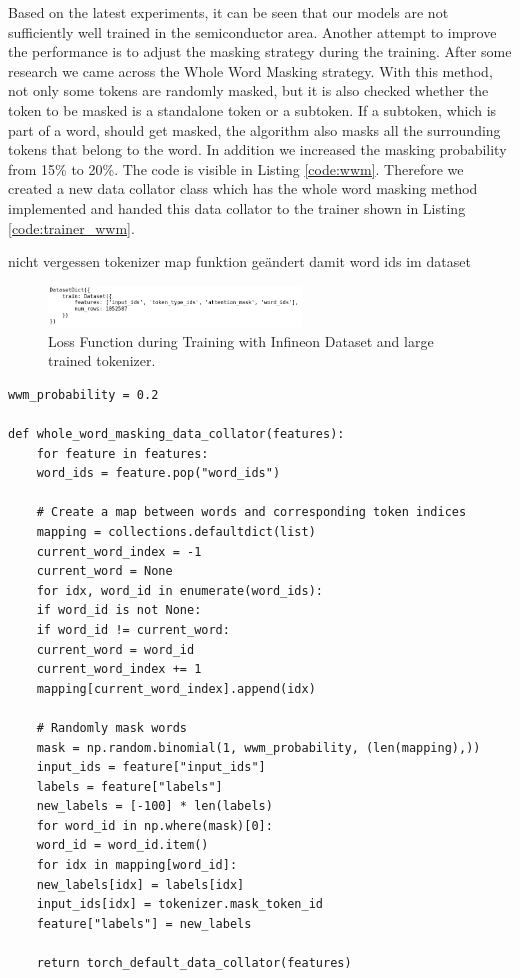 Based on the latest experiments, it can be seen that our models are not sufficiently well trained in the semiconductor area. Another attempt to improve the performance is to adjust the masking strategy during the training. After some research we came across the Whole Word Masking strategy. With this method, not only some tokens are randomly masked, but it is also checked whether the token to be masked is a standalone token or a subtoken. If a subtoken, which is part of a word, should get masked, the algorithm also masks all the surrounding tokens that belong to the word. In addition we increased the masking probability from 15\% to 20\%. The code is visible in Listing \ref{code:wwm}. Therefore we created a new data collator class \alert{which has the whole word masking method implemented} and handed this data collator to the trainer shown in Listing \ref{code:trainer_wwm}.

\alert{nicht vergessen tokenizer map funktion geändert damit word ids im dataset}
\begin{figure}[H]
	\centering
	\includegraphics[width=0.6\textwidth]{figures/tok_dataset_wordids.png}
	\caption{Loss Function during Training with Infineon Dataset and large trained tokenizer.}
	\label{fig:data_wordids}
\end{figure}

\begin{code}
	\label{code:wwm}
\begin{verbatim}
wwm_probability = 0.2

def whole_word_masking_data_collator(features):
	for feature in features:
	word_ids = feature.pop("word_ids")
	
	# Create a map between words and corresponding token indices
	mapping = collections.defaultdict(list)
	current_word_index = -1
	current_word = None
	for idx, word_id in enumerate(word_ids):
	if word_id is not None:
	if word_id != current_word:
	current_word = word_id
	current_word_index += 1
	mapping[current_word_index].append(idx)
	
	# Randomly mask words
	mask = np.random.binomial(1, wwm_probability, (len(mapping),))
	input_ids = feature["input_ids"]
	labels = feature["labels"]
	new_labels = [-100] * len(labels)
	for word_id in np.where(mask)[0]:
	word_id = word_id.item()
	for idx in mapping[word_id]:
	new_labels[idx] = labels[idx]
	input_ids[idx] = tokenizer.mask_token_id
	feature["labels"] = new_labels
	
	return torch_default_data_collator(features)
\end{verbatim}
\end{code}

